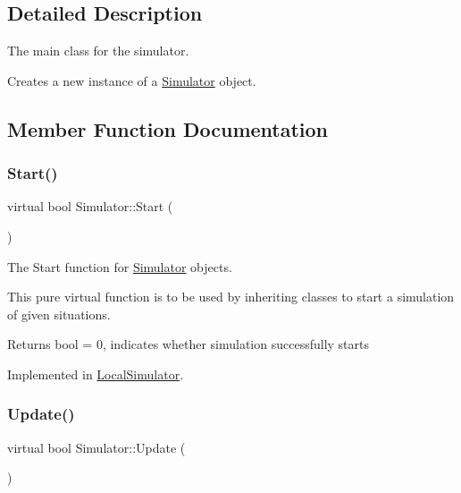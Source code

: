 \subsection{Detailed Description}
The main class for the simulator. 

Creates a new instance of a \hyperlink{classSimulator}{Simulator} object. 

\subsection{Member Function Documentation}
\mbox{\label{classSimulator_a0db68bef442ba6061a5f38189bbe3512}} 
\subsubsection{\texorpdfstring{Start()}{Start()}}
{\footnotesize\ttfamily virtual bool Simulator\+::\+Start (\begin{DoxyParamCaption}{ }\end{DoxyParamCaption})\hspace{0.3cm}{\ttfamily [pure virtual]}}



The Start function for \hyperlink{classSimulator}{Simulator} objects. 

This pure virtual function is to be used by inheriting classes to start a simulation of given situations.

\begin{DoxyReturn}{Returns}
bool = 0, indicates whether simulation successfully starts 
\end{DoxyReturn}


Implemented in \hyperlink{classLocalSimulator_a380634942668855dd1da8276b270b362}{Local\+Simulator}.

\mbox{\label{classSimulator_a7a5a1cbfa1e0cf9b82fe9d2e4b3b80ae}} 
\subsubsection{\texorpdfstring{Update()}{Update()}}
{\footnotesize\ttfamily virtual bool Simulator\+::\+Update (\begin{DoxyParamCaption}{ }\end{DoxyParamCaption})\hspace{0.3cm}{\ttfamily [pure virtual]}}



